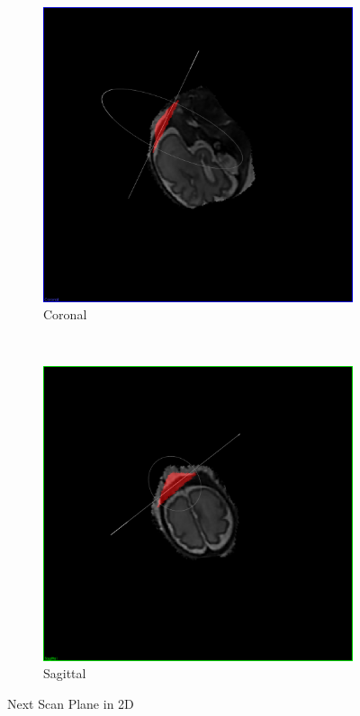 \begin{figure}[H]
\begin{subfigure}[b]{0.3\textwidth}
    \includegraphics[width=\textwidth]{images/next_scan_plane/coronal.png}
    \caption*{Coronal}
    \label{fig:nextscanplanecoronal}
  \end{subfigure}%
  ~%
  \begin{subfigure}[b]{0.3\textwidth}
    \includegraphics[width=\textwidth]{images/next_scan_plane/sagittal.png}
    \caption*{Sagittal}
    \label{fig:nextscanplanesagittal}
  \end{subfigure}
  \caption{Next Scan Plane in 2D}\label{fig:nextscanplane2d}
\end{figure}